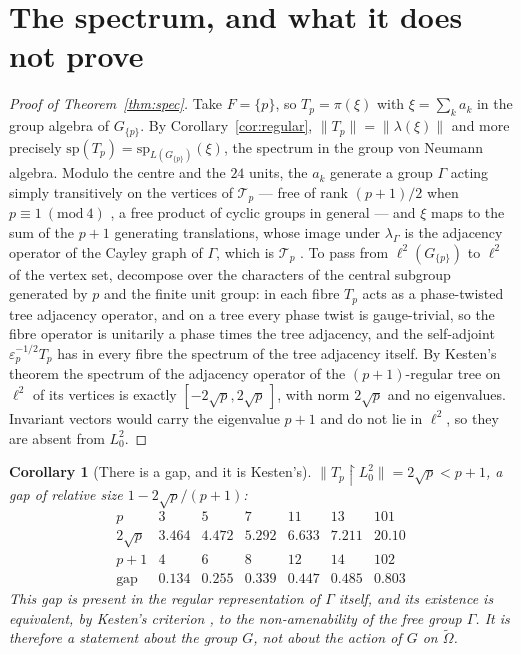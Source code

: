 \documentclass[11pt]{amsart}
\numberwithin{equation}{section}
\newtheorem{corollary}[theorem]{Corollary}
\theoremstyle{definition}
\theoremstyle{remark}
\newcommand{\cT}{\mathcal{T}}
\begin{document}
\section{The spectrum, and what it does not prove}\label{sec:spec}

\begin{proof}[Proof of Theorem~\ref{thm:spec}]
Take $F=\{p\}$, so $T_p=\pi(\xi)$ with $\xi=\sum_ka_k$ in the group algebra of $G_{\{p\}}$. By
Corollary~\ref{cor:regular}, $\|T_p\|=\|\lambda(\xi)\|$ and more precisely
$\mathrm{sp}(T_p)=\mathrm{sp}_{L(G_{\{p\}})}(\xi)$, the spectrum in the group von Neumann algebra.
Modulo the centre and the $24$ units, the $a_k$ generate a group $\Gamma$
acting simply transitively on the vertices of $\cT_p$ --- free of rank $(p+1)/2$ when
$p\equiv1\ (\mathrm{mod}\ 4)$ \cite{LPS}, a free product of cyclic groups in general ---
and $\xi$ maps to the sum of the
$p+1$ generating translations, whose image under $\lambda_\Gamma$ is the adjacency operator of the
Cayley graph of $\Gamma$, which is $\cT_p$ \cite{Serre}. To pass from $\ell^2(G_{\{p\}})$ to
$\ell^2$ of the vertex set, decompose over the characters of the central subgroup generated
by $p$ and the finite unit group: in each fibre $T_p$ acts as a phase-twisted tree adjacency
operator, and on a tree every phase twist is gauge-trivial, so the fibre operator is
unitarily a phase times the tree adjacency, and the self-adjoint $\varepsilon_p^{-1/2}T_p$
has in every fibre the spectrum of the tree adjacency itself. By Kesten's theorem \cite{Kesten} the
spectrum of the adjacency
operator of the $(p+1)$-regular tree on $\ell^2$ of its vertices is exactly
$[-2\sqrt p,2\sqrt p\,]$, with norm $2\sqrt p$ and no eigenvalues. Invariant vectors would carry
the eigenvalue $p+1$ and do not lie in $\ell^2$, so they are absent from $L^2_0$.
\end{proof}

\begin{corollary}[There is a gap, and it is Kesten's]\label{cor:gap}
$\|T_p\restriction L^2_0\|=2\sqrt p<p+1$, a gap of relative size $1-2\sqrt p/(p+1)$:
\[
\begin{array}{lrrrrrr}
p & 3 & 5 & 7 & 11 & 13 & 101\\
2\sqrt p & 3.464 & 4.472 & 5.292 & 6.633 & 7.211 & 20.10\\
p+1 & 4 & 6 & 8 & 12 & 14 & 102\\
\text{gap} & 0.134 & 0.255 & 0.339 & 0.447 & 0.485 & 0.803
\end{array}
\]
This gap is present in the regular representation of $\Gamma$ itself, and its existence is
equivalent, by Kesten's criterion \cite{Kesten}, to the non-amenability of the free group
$\Gamma$. It is
therefore a statement about the \emph{group} $G$, not about the \emph{action} of $G$ on
$\widetilde\Omega$.
\end{corollary}
\end{document}
